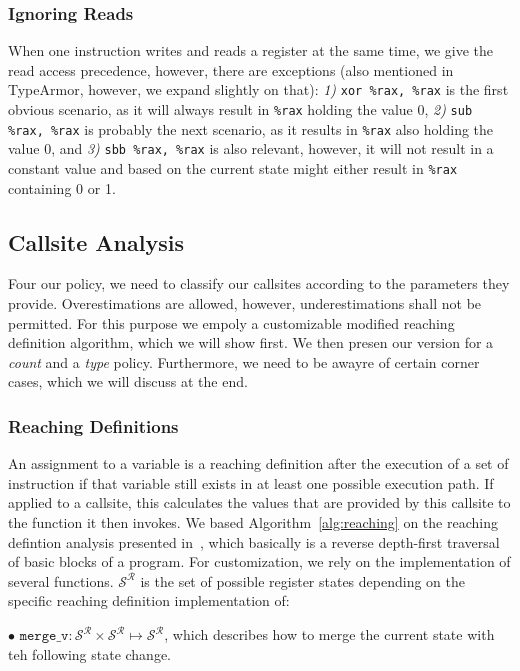 \subsubsection{Ignoring Reads} When one instruction writes and reads a register at the same time, we give the read access precedence, however, there are exceptions (also mentioned in TypeArmor, however, we expand slightly on that):
\textit{1)} \texttt{xor \%rax, \%rax} is the first obvious scenario, as it will always result in \texttt{\%rax} holding the value 0,
\textit{2)} \texttt{sub \%rax, \%rax} is probably the next scenario, as it results in \texttt{\%rax} also holding the value 0, and
\textit{3)} \texttt{sbb \%rax, \%rax} is also relevant, however, it will not result in a constant value and based on the current state might either result 
in \texttt{\%rax} containing 0 or 1.

\subsection{Callsite Analysis}
\label{section:callsiteanalysis}
Four our policy, we need to classify our callsites according to the parameters they provide. Overestimations are allowed, however,
underestimations shall not be permitted. For this purpose we empoly a customizable modified reaching definition algorithm, 
which we will show first. We then presen our version for a \emph{count} and a \emph{type} policy. Furthermore, we need to 
be awayre of certain corner cases, which we will discuss at the end.

\subsubsection{Reaching Definitions}
\label{subsection:reachindefinitionstheory}
An assignment to a variable is a reaching definition after the execution of a set of instruction if that variable still exists in at least one possible execution path. 
If applied to a callsite, this calculates the values that are provided by this callsite to the function it then invokes. 
We based Algorithm~\ref{alg:reaching} on the reaching defintion analysis presented in~\cite{khedker2009data}, 
which basically is a reverse depth-first traversal of basic blocks of a program. For customization, we rely on 
the implementation of several functions. $\mathcal{S}^\mathcal{R}$ is the set of possible register states depending on the specific reaching definition implementation of:

$\bullet$ $\texttt{merge\_v} : \mathcal{S}^\mathcal{R} \times \mathcal{S}^\mathcal{R} \mapsto \mathcal{S}^\mathcal{R}$, which describes how to merge the current state with teh following state change.

